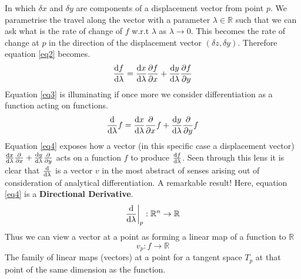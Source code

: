 \documentclass[a4paper]{article}
\begin{document}
In which $\delta x$ and $\delta y$ are components of a displacement vector from point $p$. We parametrise the travel along the vector with a parameter $\lambda \in \mathbb{R}$ such that we can ask what is the rate of change of $f$ w.r.t $\lambda$ as $\lambda \to 0$. This becomes the rate of change at $p$ in the direction of the displacement vector $(\delta z, \delta y)$. Therefore equation \ref{eq2} becomes.
\begin{equation}
\dv{f}{\lambda}=\dv{x}{\lambda} \pdv{f}{x}+ \dv{y}{\lambda} \pdv{f}{y} \label{eq3}
\end{equation}
Equation \ref{eq3} is illuminating if once more we consider differentiation as a function acting on functions.
\begin{equation}
\dv{}{\lambda} f = \dv{x}{\lambda} \pdv{}{x} f+\dv{y}{\lambda} \pdv{}{y} f\label{eq4}
\end{equation}
Equation \ref{eq4} exposes how a vector (in this specific case a displacement vector) $\dv{x}{\lambda} \pdv{}{x} + \dv{y}{\lambda} \pdv{}{y}$ acts on a function $f$ to produce $\dv{f}{\lambda}$. Seen through this lens it is clear that $\dv{}{\lambda}$ is a vector $v$ in the most abstract of senses arising out of consideration of analytical differentiation. A remarkable result! Here, equation \ref{eq4} is a \textbf{Directional Derivative}.
\begin{equation}
\dv{}{\lambda} \bigg\rvert_p : \mathbb{R}^n \to \mathbb{R}
\end{equation}
Thus we can view a vector at a point as forming a linear map of a function to $\mathbb{R}$
\begin{equation}
v_p:f \to \mathbb{R}
\end{equation}
The family of linear maps (vectors) at a point for a tangent space $T_p$ at that point of the same dimension as the function. 
\end{document}
